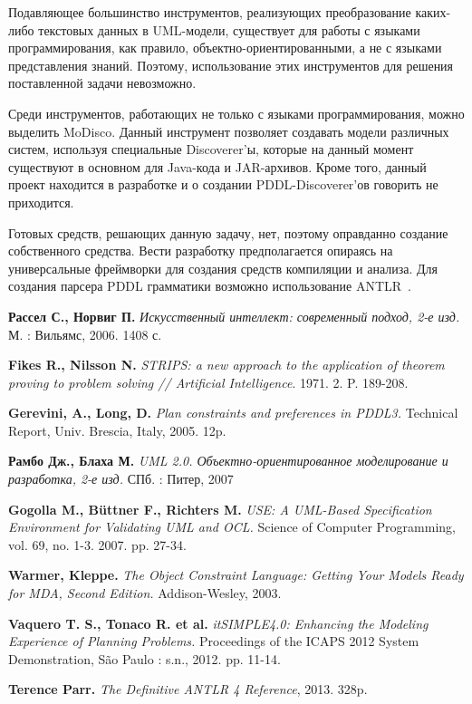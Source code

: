 \documentclass[a4paper,14pt]{extreport}
\begin{document}
    Подавляющее большинство инструментов, реализующих преобразование каких-либо текстовых данных в UML-модели, существует для работы с языками программирования, как правило, объектно-ориентированными, а не с языками представления знаний. Поэтому, использование этих инструментов для решения поставленной задачи невозможно. 
    
    Среди инструментов, работающих не только с языками программирования, можно выделить MoDisco. Данный инструмент позволяет создавать модели различных систем, используя специальные Discoverer'ы, которые на данный момент существуют в основном для Java-кода и JAR-архивов. Кроме того, данный проект находится в разработке и о создании PDDL-Discoverer'ов говорить не приходится. 
    
    Готовых средств, решающих данную задачу, нет, поэтому оправданно создание собственного средства. Вести разработку предполагается опираясь на универсальные фреймворки для создания средств компиляции и анализа. Для создания парсера PDDL грамматики возможно использование ANTLR~\cite{antlr}.
    

\newpage
\begin{thebibliography}{00}

\textbf{Рассел С., Норвиг П.} \textit{Искусственный интеллект: современный подход, 2-е изд.} М. : Вильямс, 2006. 1408 с.

\textbf{Fikes R., Nilsson N.} \textit{STRIPS: a new approach to the application of theorem
proving to problem solving // Artificial Intelligence}. 1971. 2. P. 189-208.

\textbf{Gerevini, A., Long, D.} \textit{Plan constraints and preferences in PDDL3.} Technical Report, Univ. Brescia, Italy, 2005. 12p.

\textbf{Рамбо Дж., Блаха М.} \textit{UML 2.0. Объектно-ориентированное моделирование и разработка, 2-е изд.} СПб. : Питер, 2007


\textbf{Gogolla M., Büttner F., Richters M.} \textit{USE: A UML-Based Specification Environment for Validating UML and OCL.} Science of Computer Programming, vol. 69, no. 1-3. 2007. pp. 27-34.


\textbf{Warmer, Kleppe.} \textit{The Object Constraint Language: Getting Your Models Ready for MDA, Second Edition.} Addison-Wesley, 2003.

\textbf{Vaquero T. S., Tonaco R. et al.} \textit{itSIMPLE4.0: Enhancing the Modeling
Experience of Planning Problems.} Proceedings of the ICAPS 2012 System
Demonstration, São Paulo : s.n., 2012. pp. 11-14.

\textbf{Terence Parr.} \textit{ The Definitive ANTLR 4 Reference}, 2013. 328p.

\end{thebibliography}
\end{document}
